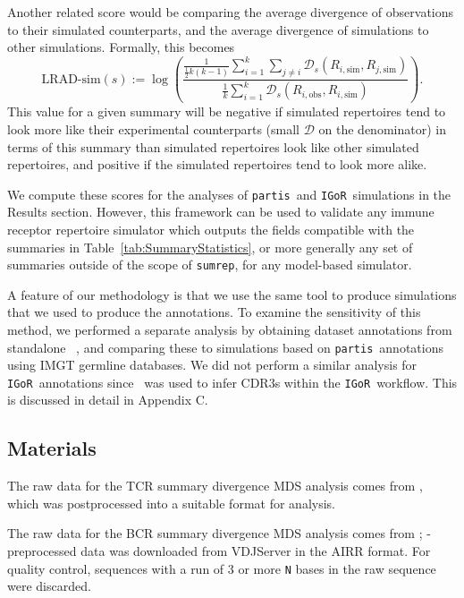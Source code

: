 \documentclass{article}
\newcommand{\partis}{\texttt{partis}}
\newcommand{\igor}{\texttt{IGoR}}
\newcommand{\igblast}{\text{IgBlast}}
\begin{document}
Another related score would be comparing the average divergence of observations to their simulated counterparts, and the average divergence of simulations to other simulations.
Formally, this becomes
\begin{equation}\label{eq:ScoreSim}
    \text{LRAD-sim}(s) :=
    \log \left(
        \frac{
            \frac{1}{\frac{1}{2} k\left(k - 1\right)}
            \sum_{i=1}^{k}
            \sum_{j \ne i}
                \mathcal D_s\left(R_{i, \text{sim}}, R_{j, \text{sim}}\right)
        }
        {
            \frac{1}{k}
            \sum_{i = 1}^k
                \mathcal D_s \left( R_{i, \text{obs}}, R_{i, \text{sim}}\right)
        }
    \right).
\end{equation}
This value for a given summary will be negative if simulated repertoires tend to look more like their experimental counterparts (small $\mathcal D$ on the denominator) in terms of this summary than simulated repertoires look like other simulated repertoires, and positive if the simulated repertoires tend to look more alike.

We compute these scores for the analyses of \partis\ and \igor\ simulations in the Results section.
However, this framework can be used to validate any immune receptor repertoire simulator which outputs the fields compatible with the summaries in Table~\ref{tab:SummaryStatistics}, or more generally any set of summaries outside of the scope of \texttt{sumrep}, for any model-based simulator.

A feature of our methodology is that we use the same tool to produce simulations that we used to produce the annotations.
To examine the sensitivity of this method, we performed a separate analysis by obtaining dataset annotations from standalone \igblast~\cite{Ye2013-kl}, and comparing these to simulations based on \partis\ annotations using IMGT germline databases.
We did not perform a similar analysis for \igor\ annotations since \igblast\ was used to infer CDR3s within the \igor\ workflow.
This is discussed in detail in Appendix C.


\subsection*{Materials}
The raw data for the TCR summary divergence MDS analysis comes from \cite{Pogorelyy2018-ak}, which was postprocessed into a suitable format for analysis.

The raw data for the BCR summary divergence MDS analysis comes from \cite{Rubelt2016-tl}; \igblast-preprocessed data was downloaded from VDJServer in the AIRR format.
For quality control, sequences with a run of 3 or more \texttt{N} bases in the raw sequence were discarded.
\end{document}
